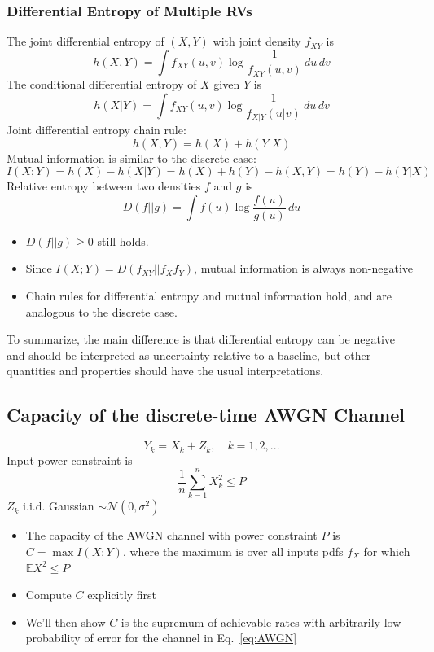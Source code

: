 \documentclass[12pt]{article}
\newcommand{\sigd}{\sigma^2}
\begin{document}
\subsubsection{Differential Entropy of Multiple RVs}
The joint differential entropy of $(X,Y)$ with joint density $f_{XY}$ is
\[
h(X,Y) = \int f_{XY}(u,v)\log\frac{1}{f_{XY}(u,v)}\,du\,dv
\]
The conditional differential entropy of $X$ given $Y$ is
\[
h(X|Y) = \int f_{XY}(u,v)\log\frac{1}{f_{X|Y}(u|v)}\,du\,dv
\]
Joint differential entropy chain rule:
\[
h(X,Y) = h(X) + h(Y|X)
\]
Mutual information is similar to the discrete case:
\[
I(X;Y) = h(X) - h(X|Y) = h(X) + h(Y) -h(X,Y) = h(Y) - h(Y|X)
\]
Relative entropy between two densities $f$ and $g$ is
\[
D(f||g) = \int f(u)\log\frac{f(u)}{g(u)}\, du
\]
\begin{itemize}
    \item $D(f||g) \ge 0$ still holds.
    \item Since $I(X;Y)=D(f_{XY}||f_Xf_Y)$, mutual information is always non-negative
    \item Chain rules for differential entropy and mutual information hold, and are analogous to the discrete case.
\end{itemize}
To summarize, the main difference is that differential entropy can be negative and should be interpreted as uncertainty relative to a baseline, but other quantities and properties should have the usual interpretations.

\subsection{Capacity of the discrete-time AWGN Channel}
\begin{equation}
Y_k=X_k+Z_k, \quad k=1,2,...
\label{eq:AWGN}
\end{equation}
Input power constraint is 
\[
\frac{1}{n}\sum_{k=1}^n X_k^2 \le P
\]
$Z_k$ i.i.d. Gaussian $\sim \mathcal{N}(
0,\sigd)$
\begin{itemize}
    \item The capacity of the AWGN channel with power constraint $P$ is $C=\max I(X;Y)$, where the maximum is over all inputs pdfs $f_X$ for which $\mathbb{E}X^2 \le P$
    \item Compute $C$ explicitly first
    \item We'll then show $C$ is the supremum of achievable rates with arbitrarily low probability of error for the channel in Eq.~\ref{eq:AWGN}
\end{itemize}
\end{document}
